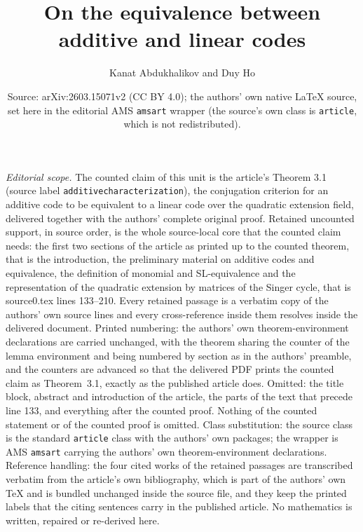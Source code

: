\documentclass[10pt,a4paper]{amsart}
\title{On the equivalence between additive and linear codes}
\author{Kanat Abdukhalikov and Duy Ho}
\date{Source: arXiv:2603.15071v2 (CC BY 4.0); the authors' own native \LaTeX{} source, set here in the editorial AMS \texttt{amsart} wrapper (the source's own class is \texttt{article}, which is not redistributed).}
\theoremstyle{plain}
\theoremstyle{definition}
\begin{document}
\maketitle
\noindent\textit{Editorial scope.} The counted claim of this unit is the article's Theorem 3.1 (source label \texttt{additivecharacterization}), the conjugation criterion for an additive code to be equivalent to a linear code over the quadratic extension field, delivered together with the authors' complete original proof. Retained uncounted support, in source order, is the whole source-local core that the counted claim needs: the first two sections of the article as printed up to the counted theorem, that is the introduction, the preliminary material on additive codes and equivalence, the definition of monomial and SL-equivalence and the representation of the quadratic extension by matrices of the Singer cycle, that is source0.tex lines 133--210. Every retained passage is a verbatim copy of the authors' own source lines and every cross-reference inside them resolves inside the delivered document. Printed numbering: the authors' own theorem-environment declarations are carried unchanged, with the theorem sharing the counter of the lemma environment and being numbered by section as in the authors' preamble, and the counters are advanced so that the delivered PDF prints the counted claim as Theorem~3.1, exactly as the published article does. Omitted: the title block, abstract and introduction of the article, the parts of the text that precede line 133, and everything after the counted proof. Nothing of the counted statement or of the counted proof is omitted. Class substitution: the source class is the standard \texttt{article} class with the authors' own packages; the wrapper is AMS \texttt{amsart} carrying the authors' own theorem-environment declarations. Reference handling: the four cited works of the retained passages are transcribed verbatim from the article's own bibliography, which is part of the authors' own TeX and is bundled unchanged inside the source file, and they keep the printed labels that the citing sentences carry in the published article. No mathematics is written, repaired or re-derived here.
\end{document}
